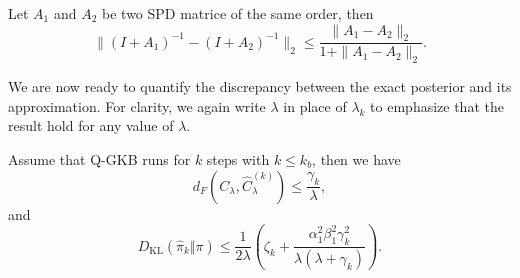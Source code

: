 \documentclass[]{myarticle}
\begin{document}
\begin{lemma}\label{lem:inv_bnd}
  Let $A_1$ and $A_2$ be two SPD matrice of the same order, then
  \begin{equation*}
    \|(I+A_1)^{-1}-(I+A_2)^{-1}\|_2 \leq \frac{\|A_1-A_2\|_2}{1+\|A_1-A_2\|_2}.
  \end{equation*}
\end{lemma}

We are now ready to quantify the discrepancy between the exact posterior and its approximation. For clarity, we again write $\lambda$ in place of $\lambda_k$ to emphasize that the result hold for any value of $\lambda$.

\begin{theorem}\label{thm:bnd_post}
  Assume that Q-GKB runs for $k$ steps with $k\leq k_b$, then we have
  \begin{equation}
    d_{F}(C_{\lambda},\widehat{C}_{\lambda}^{(k)}) \leq \frac{\gamma_k}{\lambda} ,
  \end{equation}
  and 
  \begin{equation}
    D_{\mathrm{KL}}(\widehat{\pi}_k\Vert\pi) \leq \frac{1}{2\lambda}\left(\zeta_{k}+\frac{\alpha_{1}^2\beta_{1}^2\gamma_{k}^2}{\lambda(\lambda+\gamma_{k})}\right).
  \end{equation}
\end{theorem}
\end{document}
